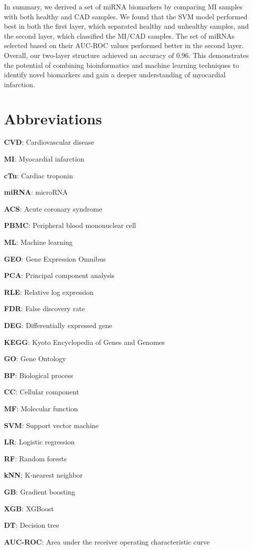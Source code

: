 \documentclass[sn-mathphys,Numbered]{sn-jnl}%
\theoremstyle{thmstyleone}%
\theoremstyle{thmstyletwo}%
\theoremstyle{thmstylethree}%
\begin{document}
In summary, we derived a set of miRNA biomarkers by comparing MI samples
with both healthy and CAD samples. We found that the SVM model performed
best in both the first layer, which separated healthy and unhealthy
samples, and the second layer, which classified the MI/CAD samples. The
set of miRNAs selected based on their AUC-ROC values performed better in
the second layer. Overall, our two-layer structure achieved an accuracy
of 0.96. This demonstrates the potential of combining bioinformatics and
machine learning techniques to identify novel biomarkers and gain a
deeper understanding of myocardial infarction.

\section{Abbreviations}\label{abbreviations}

\begin{description}
  \item \textbf{CVD}: Cardiovascular disease
  \item \textbf{MI}: Myocardial infarction
  \item \textbf{cTn}: Cardiac troponin
  \item \textbf{miRNA}: microRNA
  \item \textbf{ACS}: Acute coronary syndrome
  \item \textbf{PBMC}: Peripheral blood mononuclear cell 
  \item \textbf{ML}: Machine learning 
  \item \textbf{GEO}: Gene Expression Omnibus 
  \item \textbf{PCA}: Principal component analysis 
  \item \textbf{RLE}: Relative log expression 
  \item \textbf{FDR}: False discovery rate 
  \item \textbf{DEG}: Differentially expressed gene
  \item \textbf{KEGG}: Kyoto Encyclopedia of Genes and Genomes 
  \item \textbf{GO}: Gene Ontology  
  \item \textbf{BP}: Biological process 
  \item \textbf{CC}: Cellular component 
  \item \textbf{MF}: Molecular function 
  \item \textbf{SVM}: Support vector machine 
  \item \textbf{LR}: Logistic regression 
  \item \textbf{RF}: Random forests
  \item \textbf{kNN}: K-nearest neighbor 
  \item \textbf{GB}: Gradient boosting 
  \item \textbf{XGB}: XGBoost 
  \item \textbf{DT}: Decision tree 
  \item \textbf{AUC-ROC}: Area under the receiver operating characteristic curve 
\end{description}
\end{document}
